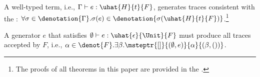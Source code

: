 \begin{theorem}\label{theorem:fundamental}A well-typed term, i.e., \(\Gamma\vdash e : \uhat{H}{t}{F}\), generates traces consistent with the \tyName: $\forall \sigma \in \denotation{\Gamma}. \sigma(e) \in \denotation{\sigma(\uhat{H}{t}{F})}$.\footnote{The proofs of all theorems in this paper are provided in the \techreport{}.}
\end{theorem}

\begin{corollary}\label{theorem:sound} A generator \(e\) that satisfies \(\emptyset \vdash e : \uhat{\epsilon}{\Unit}{F}\) must produce all traces accepted by $F$, i.e., $\alpha \in \denot{F}. \exists \beta.\msteptr{[]}{(\emptyset, e)}{\alpha}{(\beta, ())}$.
\end{corollary}
